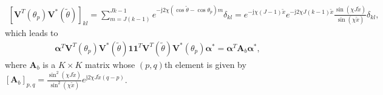 \documentclass[12pt, draftclsnofoot, onecolumn]{IEEEtran}
\begin{document}
\begin{align*}
{{\left[ {{\mathbf{V}}^{T}}\left( {{\theta }_{p}} \right){{\mathbf{V}}^{*}}\left( {\tilde{\theta }} \right) \right]}_{kl}}= \sum\limits_{m=J\left( k-1 \right)}^{Jk-1}{{{e}^{-\text{j}2\chi\left( \cos \tilde{\theta }-\cos {{\theta }_{p}} \right)m}}}{{\delta }_{kl}}
={{e}^{-\text{j}\chi \left( J-1 \right)\tilde{x}}} {{e}^{-\text{j}2\chi J \left( k-1 \right)\tilde{x}}} \frac{\sin \left( \chi J\tilde{x} \right)}{\sin \left( \chi\tilde{x} \right)}{{\delta }_{kl}},
\end{align*}
which leads to
\begin{align} \label{Ab}
{{\boldsymbol{\alpha }}^{T}}{{\mathbf{V}}^{T}}\left( {{\theta }_{p}} \right){{\mathbf{V}}^{*}}\left( {\tilde{\theta }} \right)\mathbf{1}{{\mathbf{1}}^{T}}{{\mathbf{V}}^{T}}\left( {\tilde{\theta }} \right){{\mathbf{V}}^{\text{*}}}\left( {{\theta }_{p}} \right){{\boldsymbol{\alpha }}^{\text{*}}}={{\boldsymbol{\alpha }}^{T}}{{\mathbf{A}}_{b}}{{\boldsymbol{\alpha }}^{\text{*}}},
\end{align}
where ${\mathbf{A}}_{b}$ is a $K \times K$ matrix whose $(p,q)$th element is given by $[{\mathbf{A}}_{b}]_{p,q} =\frac{{{\sin }^{2}}\left( \chi J\tilde{x} \right)}{{{\sin }^{2}}\left( \chi\tilde{x} \right)} {{e}^{\text{j}2\chi J\tilde{x} \left( q-p \right)}}$.
\end{document}
